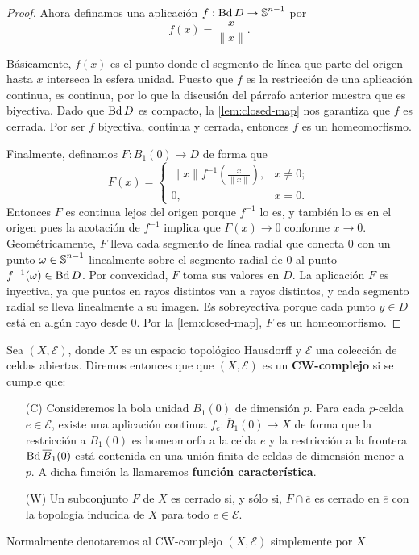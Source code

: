 \begin{proof}
	Ahora definamos una aplicación $f : \operatorname{Bd} D \to \operatorname{\mathbb{S}}^{n-1}$ por
	\[
	f(x) = \frac{x}{\|x\|}.
	\]
	
	Básicamente, $f(x)$ es el punto donde el segmento de línea que parte del
	origen hasta $x$ interseca la esfera unidad. Puesto que $f$ es la restricción de
	una aplicación continua, es continua, por lo que la discusión del párrafo anterior
	muestra que es biyectiva. Dado que $\operatorname{Bd} D$ es compacto, la \autoref{lem:closed-map}
	nos garantiza que $f$ es cerrada. Por ser $f$ biyectiva, continua y cerrada,
	entonces $f$ es un homeomorfismo.
	
	Finalmente, definamos $F : \overline{B}_{1}(0) \to D$ de forma que
	\[
	F(x) =
	\begin{cases}
		\|x\| f^{-1}\left( \frac{x}{\|x\|}\right), & x \neq 0; \\
		0,                                         & x = 0.
	\end{cases}
	\]
	Entonces $F$ es continua lejos del origen porque $f^{-1}$ lo es, y también lo
	es en el origen pues la acotación de $f^{-1}$ implica que $F(x) \to 0$
	conforme $x \to 0$. Geométricamente, $F$ lleva cada segmento de línea radial
	que conecta $0$ con un punto $\omega \in \operatorname{\mathbb{S}}^{n-1}$ linealmente sobre el
	segmento radial de $0$ al punto $f^{-1}(\omega) \in \operatorname{Bd} D$. Por convexidad,
	$F$ toma sus valores en $D$. La aplicación $F$ es inyectiva, ya que puntos en
	rayos distintos van a rayos distintos, y cada segmento radial se lleva linealmente
	a su imagen. Es sobreyectiva porque cada punto $y \in D$ está en algún rayo
	desde $0$. Por la \autoref{lem:closed-map}, $F$ es un homeomorfismo.
\end{proof}

\begin{definicion}
	Sea $(X,\mathcal{E})$, donde $X$ es un espacio topológico Hausdorff y
	$\mathcal{E}$ una colección de celdas abiertas. Diremos entonces que que $(X,\mathcal{E}
	)$ es un \textbf{CW-complejo} si se cumple que:
	\begin{enumerate}[font=\bfseries]
		\item[(C)] Consideremos la bola unidad $B_{1}(0)$ de dimensión $p$. Para
		cada $p$-celda $e \in \mathcal{E}$, existe una aplicación continua $f_{e}:
		\overline{B}_{1}(0) \to X$ de forma que la restricción a $B_{1}(0)$ es homeomorfa
		a la celda $e$ y la restricción a la frontera $\operatorname{Bd} \overline{B}_{1}(0)$ está
		contenida en una unión finita de celdas de dimensión menor a $p$. A dicha
		función la llamaremos \textbf{función característica}.
		
		\item[(W)] Un subconjunto $F$ de $X$ es cerrado si, y sólo si, $F \cap \overline
		{e}$ es cerrado en $\overline{e}$ con la topología inducida de $X$ para todo
		$e \in \mathcal{E}$.
	\end{enumerate}
	Normalmente denotaremos al CW-complejo $(X,\mathcal{E})$ simplemente por $X$.
\end{definicion}

